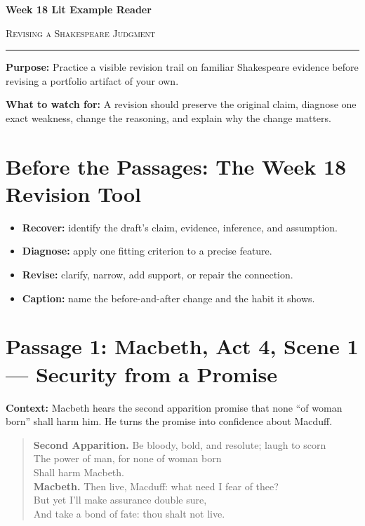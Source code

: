\documentclass[12pt]{article}
\newenvironment{playpassage}{\begin{quote}\footnotesize\setlength{\parskip}{0.08em}\setlength{\parindent}{0pt}}{\end{quote}}
\newcommand{\speaker}[1]{\textbf{#1.}}
\begin{document}
\begin{center}
{\LARGE\bfseries Week 18 Lit Example Reader}\par\vspace{0.02em}
{\large\scshape Revising a Shakespeare Judgment}\par\vspace{0.06em}
\rule{0.78\textwidth}{0.5pt}
\end{center}

\textbf{Purpose:} Practice a visible revision trail on familiar Shakespeare evidence before revising a portfolio artifact of your own.

\textbf{What to watch for:} A revision should preserve the original claim, diagnose one exact weakness, change the reasoning, and explain why the change matters.

\section*{Before the Passages: The Week 18 Revision Tool}
\begin{itemize}[leftmargin=1.3em,itemsep=0.05em,topsep=0.08em,parsep=0.03em]
\item \textbf{Recover:} identify the draft's claim, evidence, inference, and assumption.
\item \textbf{Diagnose:} apply one fitting criterion to a precise feature.
\item \textbf{Revise:} clarify, narrow, add support, or repair the connection.
\item \textbf{Caption:} name the before-and-after change and the habit it shows.
\end{itemize}

\section*{Passage 1: Macbeth, Act 4, Scene 1 --- Security from a Promise}
\textbf{Context:} Macbeth hears the second apparition promise that none ``of woman born'' shall harm him. He turns the promise into confidence about Macduff.
\begin{playpassage}
\speaker{Second Apparition} Be bloody, bold, and resolute; laugh to scorn\\
The power of man, for none of woman born\\
Shall harm Macbeth.\\[0.25em]
\speaker{Macbeth} Then live, Macduff: what need I fear of thee?\\
But yet I'll make assurance double sure,\\
And take a bond of fate: thou shalt not live.
\end{playpassage}
\end{document}
